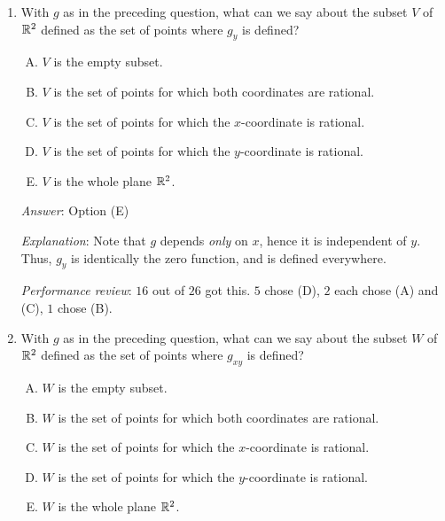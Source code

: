\documentclass[10pt]{amsart}
\begin{document}
\begin{enumerate}
  {\em Answer}: Option (A)

  {\em Explanation}: At any point $(x_0,y_0)$, there are $x$-values
  arbitrarily close to $x_0$ that are rational, and $x$-values
  arbitrarily close to $x_0$ that are irrational. Thus, $g$ is not
  continuous in $x$ at any point, so $g_x$ does not exist anywhere.

  {\em Performance review}: $15$ out of $26$ got this. $10$ chose (C),
  $1$ chose (E).

\item With $g$ as in the preceding question, what can we say about the
  subset $V$ of $\mathbb{R}^2$ defined as the set of points where $g_y$ is
  defined?

  \begin{enumerate}[(A)]
  \item $V$ is the empty subset.
  \item $V$ is the set of points for which both coordinates are rational.
  \item $V$ is the set of points for which the $x$-coordinate is rational.
  \item $V$ is the set of points for which the $y$-coordinate is rational.
  \item $V$ is the whole plane $\mathbb{R}^2$.
  \end{enumerate}

  {\em Answer}: Option (E)

  {\em Explanation}: Note that $g$ depends {\em only} on $x$, hence it
  is independent of $y$. Thus, $g_y$ is identically the zero function,
  and is defined everywhere.

  {\em Performance review}: $16$ out of $26$ got this. $5$ chose (D),
  $2$ each chose (A) and (C), $1$ chose (B).

\item With $g$ as in the preceding question, what can we say about the
  subset $W$ of $\mathbb{R}^2$ defined as the set of points where $g_{xy}$ is
  defined?

  \begin{enumerate}[(A)]
  \item $W$ is the empty subset.
  \item $W$ is the set of points for which both coordinates are rational.
  \item $W$ is the set of points for which the $x$-coordinate is rational.
  \item $W$ is the set of points for which the $y$-coordinate is rational.
  \item $W$ is the whole plane $\mathbb{R}^2$.
  \end{enumerate}


\end{enumerate}
\end{document}
